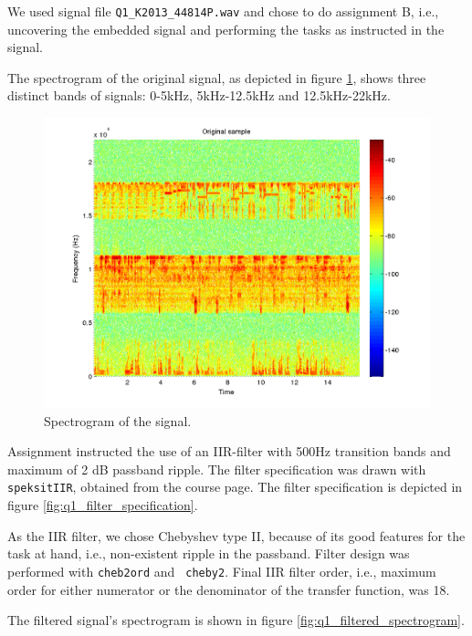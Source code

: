 We used signal file {\tt Q1\_K2013\_44814P.wav} and chose to do
assignment B, i.e., uncovering the embedded signal and performing the
tasks as instructed in the signal. 

The spectrogram of the original signal, as depicted in
figure \ref{fig:q1_spectrogram}, shows three distinct bands of signals:
0-5kHz, 5kHz-12.5kHz and 12.5kHz-22kHz.

\begin{figure}
  \begin{center}
    \hspace*{-1in}
    \includegraphics[width=180mm]{q1_spectrogram}
    \caption{Spectrogram of the signal. \label{fig:q1_spectrogram}}
  \end{center}  
\end{figure}

Assignment instructed the use of an IIR-filter with 500Hz transition
bands and maximum of 2 dB passband ripple.  The filter specification was
drawn with {\tt speksitIIR}, obtained from the course page.  The filter
specification is depicted in figure \ref{fig:q1_filter_specification}.

As the IIR filter, we chose Chebyshev type II, because of its good
features for the task at hand, i.e., non-existent ripple in the
passband.  Filter design was performed with {\tt cheb2ord} and {\tt
cheby2}.  Final IIR filter order, i.e., maximum order for either
numerator or the denominator of the transfer function, was 18.

The filtered signal's spectrogram is shown in figure
\ref{fig:q1_filtered_spectrogram}.

